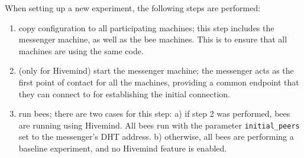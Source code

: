 When setting up a new experiment, the following steps are performed:
\begin{enumerate}
    \item copy configuration to all participating machines; this step includes the messenger machine, as well as the bee machines.
          This is to ensure that all machines are using the same code.
    \item (only for Hivemind) start the messenger machine;
          the messenger acts as the first point of contact for all the machines, providing a common endpoint that they can connect to for establishing the initial connection.
    \item run bees; there are two cases for this step:
          a) if step 2 was performed, bees are running using Hivemind. All bees run with the parameter \texttt{initial\_peers} set to the messenger's DHT address.
          b) otherwise, all bees are performing a baseline experiment, and no Hivemind feature is enabled.
\end{enumerate}

